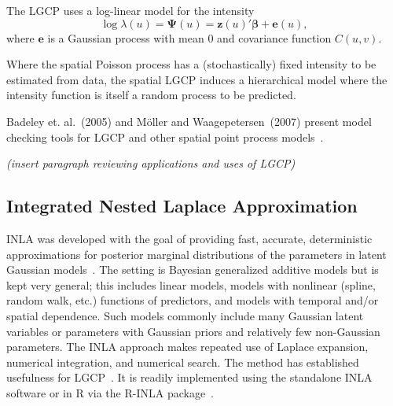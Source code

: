 \documentclass[]{interact}
\begin{document}
The LGCP uses a log-linear model for the intensity
\begin{displaymath}
\log\lambda(u) = \boldsymbol{\Psi}(u)
= \mathbf{z}(u)' \boldsymbol{\beta} + \mathbf{e}(u),
\end{displaymath}
where \(\mathbf{e}\) is a Gaussian process with mean 0 and covariance function
\(C(u, v)\).

Where the spatial Poisson process has a (stochastically) fixed intensity to be
estimated from data, the spatial LGCP induces a hierarchical model where the
intensity function is itself a random process to be predicted.

Badeley et. al.~(2005) and M\"{o}ller and Waagepetersen~(2007) present model
checking tools for LGCP and other spatial point process
models~\cite{baddeleyresiduals,moellerwaagepetersen}.

{\it (insert paragraph reviewing applications and uses of LGCP)}


\subsection{Integrated Nested Laplace Approximation}
\label{inla}

INLA was developed with the goal of providing fast, accurate, deterministic
approximations for posterior marginal distributions of the parameters in
latent Gaussian models~\cite{rueetal}. The setting is Bayesian generalized
additive models but is kept very general; this includes linear models, models
with nonlinear (spline, random walk, etc.) functions of predictors, and models
with temporal and/or spatial dependence. Such models commonly include many
Gaussian latent variables or parameters with Gaussian priors and relatively
few non-Gaussian parameters. The INLA approach makes repeated use of Laplace
expansion, numerical integration, and numerical search. The method has
established usefulness for LGCP~\cite{illianetal}. It is readily implemented
using the standalone INLA software or in R via the R-INLA
package~\cite{inlar}.
\end{document}
